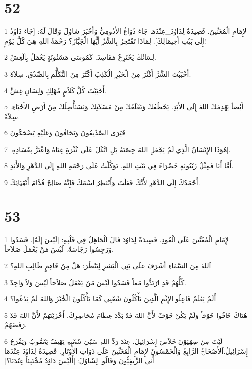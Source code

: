 \chapter{52}

\par 1 لإِمَامِ الْمُغَنِّينَ. قَصِيدَةٌ لِدَاوُدَ_عِنْدَمَا جَاءَ دُوَاغُ الأَدُومِيُّ وَأَخْبَرَ شَاوُلَ وَقَالَ لَهُ: [جَاءَ دَاوُدُ إِلَى بَيْتِ أَخِيمَالِكَ]. لِمَاذَا تَفْتَخِرُ بِالشَّرِّ أَيُّهَا الْجَبَّارُ؟ رَحْمَةُ اللهِ هِيَ كُلَّ يَوْمٍ!
\par 2 لِسَانُكَ يَخْتَرِعُ مَفَاسِدَ. كَمُوسَى مَسْنُونَةٍ يَعْمَلُ بِالْغِشِّ.
\par 3 أَحْبَبْتَ الشَّرَّ أَكْثَرَ مِنَ الْخَيْرِ الْكَذِبَ أَكْثَرَ مِنَ التَّكَلُّمِ بِالصِّدْقِ. سِلاَهْ.
\par 4 أَحْبَبْتَ كُلَّ كَلاَمٍ مُهْلِكٍ وَلِسَانِ غِشٍّ.
\par 5 أَيْضاً يَهْدِمُكَ اللهُ إِلَى الأَبَدِ. يَخْطُفُكَ وَيَقْلَعُكَ مِنْ مَسْكَنِكَ وَيَسْتَأْصِلُكَ مِنْ أَرْضِ الأَحْيَاءِ. سِلاَهْ.
\par 6 فَيَرَى الصِّدِّيقُونَ وَيَخَافُونَ وَعَلَيْهِ يَضْحَكُونَ:
\par 7 [هُوَذَا الإِنْسَانُ الَّذِي لَمْ يَجْعَلِ اللهَ حِصْنَهُ بَلِ اتَّكَلَ عَلَى كَثْرَةِ غِنَاهُ وَاعْتَزَّ بِفَسَادِهِ].
\par 8 أَمَّا أَنَا فَمِثْلُ زَيْتُونَةٍ خَضْرَاءَ فِي بَيْتِ اللهِ. تَوَكَّلْتُ عَلَى رَحْمَةِ اللهِ إِلَى الدَّهْرِ وَالأَبَدِ.
\par 9 أَحْمَدُكَ إِلَى الدَّهْرِ لأَنَّكَ فَعَلْتَ وَأَنْتَظِرُ اسْمَكَ فَإِنَّهُ صَالِحٌ قُدَّامَ أَتْقِيَائِكَ.

\chapter{53}

\par 1 لإِمَامِ الْمُغَنِّينَ عَلَى الْعُودِ. قَصِيدَةٌ لِدَاوُدَ قَالَ الْجَاهِلُ فِي قَلْبِهِ: [لَيْسَ إِلَهٌ]. فَسَدُوا وَرَجِسُوا رَجَاسَةً. لَيْسَ مَنْ يَعْمَلُ صَلاَحاً.
\par 2 اَللهُ مِنَ السَّمَاءِ أَشْرَفَ عَلَى بَنِي الْبَشَرِ لِيَنْظُرَ: هَلْ مِنْ فَاهِمٍ طَالِبِ اللهِ؟
\par 3 كُلُّهُمْ قَدِ ارْتَدُّوا مَعاً فَسَدُوا لَيْسَ مَنْ يَعْمَلُ صَلاَحاً لَيْسَ وَلاَ وَاحِدٌ.
\par 4 أَلَمْ يَعْلَمْ فَاعِلُو الإِثْمِ الَّذِينَ يَأْكُلُونَ شَعْبِي كَمَا يَأْكُلُونَ الْخُبْزَ وَاللهَ لَمْ يَدْعُوا؟
\par 5 هُنَاكَ خَافُوا خَوْفاً وَلَمْ يَكُنْ خَوْفٌ لأَنَّ اللهَ قَدْ بَدَّدَ عِظَامَ مُحَاصِرِكَ. أَخْزَيْتَهُمْ لأَنَّ اللهَ قَدْ رَفَضَهُمْ.
\par 6 لَيْتَ مِنْ صِهْيَوْنَ خَلاَصَ إِسْرَائِيلَ. عِنْدَ رَدِّ اللهِ سَبْيَ شَعْبِهِ يَهْتِفُ يَعْقُوبُ وَيَفْرَحُ إِسْرَائِيلُ.اَلأَصْحَاحُ الرَّابِعُ وَالْخَمْسُونَ لإِمَامِ الْمُغَنِّينَ عَلَى ذَوَاتِ الأَوْتَارِ. قَصِيدَةٌ لِدَاوُدَ عِنْدَمَا أَتَى الزِّيفِيُّونَ وَقَالُوا لِشَاوُلَ: [أَلَيْسَ دَاوُدُ مُخْتَبِئاً عِنْدَنَا؟]

